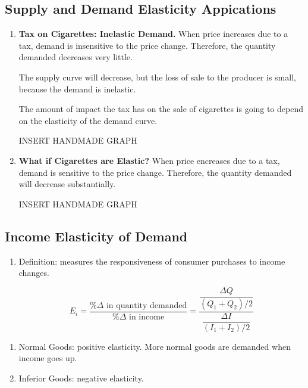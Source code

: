 \subsection{Supply and Demand Elasticity Appications}
\begin{enumerate}[label = \textbf{(\Alph*)}, itemsep = 1em, parsep = 1ex]
	\item \textbf{Tax on Cigarettes: Inelastic Demand.} When price increases due to a tax, demand is insensitive to the price change. Therefore, the quantity demanded decreases very little.

		The supply curve will decrease, but the loss of sale to the producer is small, because the demand is inelastic.

		The amount of impact the tax has on the sale of cigarettes is going to depend on the elasticity of the demand curve.

		INSERT HANDMADE GRAPH 
	\item \textbf{What if Cigarettes are Elastic?} When price encreases due to a tax, demand is sensitive to the price change. Therefore, the quantity demanded will decrease substantially.

		INSERT HANDMADE GRAPH

\end{enumerate}

\subsection{Income Elasticity of Demand}
\begin{enumerate}[label = \textbf{(\Alph*)}, itemsep = 1em]
	\item Definition: measures the responsiveness of consumer purchases to income changes.

		\[ E_i = \dfrac{\%\Delta \text{ in quantity demanded}}{ \%\Delta \text{ in income}} = \dfrac{\dfrac{\Delta Q}{(Q_1 + Q_2)/2}}{\dfrac{\Delta I}{(I_1 + I_2)/2}}\]

\end{enumerate}
\begin{enumerate}[label = \textbf{(\arabic*)}, itemsep = 1em]
	\item Normal Goods: positive elasticity. More normal goods are demanded when income goes up.

	\item Inferior Goods: negative elasticity. 
	
\end{enumerate}

\newpage

